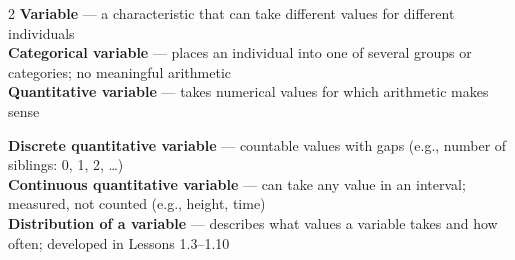 \documentclass[aspectratio=169, 11pt]{beamer}
\begin{document}
{
\begin{frame}[t, plain]
  \vspace{1.1cm}\par
  \hspace{0.4cm}%
  \begin{minipage}{0.93\textwidth}
    \vspace{0.4em}
    \footnotesize
    \begin{multicols}{2}
      \textbf{\color{greenacc}Variable} --- a characteristic that can take
        different values for different individuals\\[5pt]
      \textbf{\color{greenacc}Categorical variable} --- places an individual
        into one of several groups or categories; no meaningful arithmetic\\[5pt]
      \textbf{\color{greenacc}Quantitative variable} --- takes numerical values
        for which arithmetic makes sense

      \columnbreak

      \textbf{\color{greenacc}Discrete quantitative variable} --- countable
        values with gaps (e.g., number of siblings: 0, 1, 2, \ldots)\\[5pt]
      \textbf{\color{greenacc}Continuous quantitative variable} --- can take
        any value in an interval; measured, not counted (e.g., height, time)\\[5pt]
      \textbf{\color{greenacc}Distribution of a variable} --- describes what
        values a variable takes and how often; developed in Lessons 1.3--1.10
    \end{multicols}
  \end{minipage}
\end{frame}
}
\end{document}
